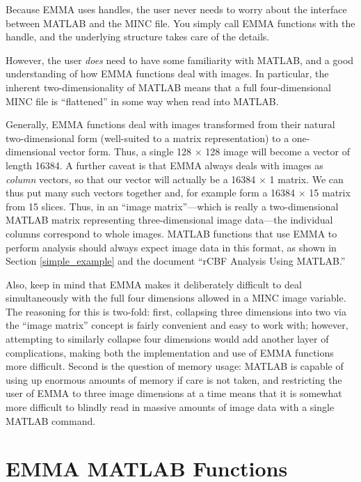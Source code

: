 Because EMMA uses handles, the user never needs to worry about the
interface between MATLAB and the MINC file.  You simply call EMMA
functions with the handle, and the underlying structure takes care of
the details.

However, the user {\em does} need to have some familiarity with
MATLAB, and a good understanding of how EMMA functions deal with
images.  In particular, the inherent two-dimensionality of MATLAB
means that a full four-dimensional MINC file is ``flattened'' in some
way when read into MATLAB.

\label{explain_images}
Generally, EMMA functions deal with images transformed from their
natural two-dimensional form (well-suited to a matrix representation)
to a one-dimensional vector form.  Thus, a single 128 $\times$ 128
image will become a vector of length 16384.  A further caveat is that
EMMA always deals with images as {\em column} vectors, so that our
vector will actually be a 16384 $\times$ 1 matrix.  We can thus put
many such vectors together and, for example form a 16384 $\times$ 15
matrix from 15 slices.  Thus, in an ``image matrix''---which is really
a two-dimensional MATLAB matrix representing three-dimensional image
data---the individual columns correspond to whole images.  MATLAB
functions that use EMMA to perform analysis should always expect image
data in this format, as shown in Section \ref{simple_example} and the
document ``rCBF Analysis Using MATLAB.''

Also, keep in mind that EMMA makes it deliberately difficult to deal
simultaneously with the full four dimensions allowed in a MINC image
variable.  The reasoning for this is two-fold: first, collapsing three
dimensions into two via the ``image matrix'' concept is fairly
convenient and easy to work with; however, attempting to similarly
collapse four dimensions would add another layer of complications,
making both the implementation and use of EMMA functions more
difficult.  Second is the question of memory usage: MATLAB is capable
of using up enormous amounts of memory if care is not taken, and
restricting the user of EMMA to three image dimensions at a time means
that it is somewhat more difficult to blindly read in massive amounts
of image data with a single MATLAB command.

\newpage
\section{EMMA MATLAB Functions}


